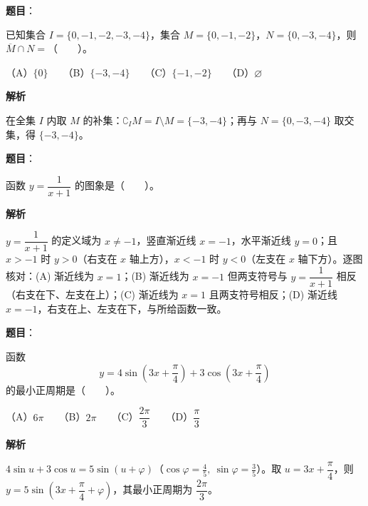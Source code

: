 

\begin{answer}

\textbf{题目}：

已知集合 $I=\{0,-1,-2,-3,-4\}$，集合 $M=\{0,-1,-2\}$，$N=\{0,-3,-4\}$，则 $\overline{M}\cap N=$\mbox{（　　）}。

（A）$\{0\}$　　（B）$\{-3,-4\}$　　（C）$\{-1,-2\}$　　（D）$\varnothing$

\textbf{解析}

在全集 $I$ 内取 $M$ 的补集：$\complement_I M=I\setminus M=\{-3,-4\}$；再与 $N=\{0,-3,-4\}$ 取交集，得 $\{-3,-4\}$。


\end{answer}
\begin{answer}

\textbf{题目}：

函数 $y=\dfrac{1}{x+1}$ 的图象是\mbox{（　　）}。
\nopagebreak[4]
\begin{center}\end{center}
\nopagebreak[4]
\textbf{解析}

$y=\dfrac{1}{x+1}$ 的定义域为 $x\ne-1$，竖直渐近线 $x=-1$，水平渐近线 $y=0$；且 $x>-1$ 时 $y>0$（右支在 $x$ 轴上方），$x<-1$ 时 $y<0$（左支在 $x$ 轴下方）。逐图核对：(A) 渐近线为 $x=1$；(B) 渐近线为 $x=-1$ 但两支符号与 $y=\dfrac1{x+1}$ 相反（右支在下、左支在上）；(C) 渐近线为 $x=1$ 且两支符号相反；(D) 渐近线 $x=-1$，右支在上、左支在下，与所给函数一致。


\end{answer}
\begin{answer}

\textbf{题目}：

函数
\nopagebreak[4]
\[
y=4\sin\left(3x+\frac\pi4\right)+3\cos\left(3x+\frac\pi4\right)
\]
的最小正周期是\mbox{（　　）}。

（A）$6\pi$　　（B）$2\pi$　　（C）$\dfrac{2\pi}{3}$　　（D）$\dfrac\pi3$

\textbf{解析}

$4\sin u+3\cos u=5\sin(u+\varphi)$（$\cos\varphi=\tfrac45,\ \sin\varphi=\tfrac35$）。取 $u=3x+\dfrac\pi4$，则 $y=5\sin\!\left(3x+\dfrac\pi4+\varphi\right)$，其最小正周期为 $\dfrac{2\pi}{3}$。


\end{answer}
